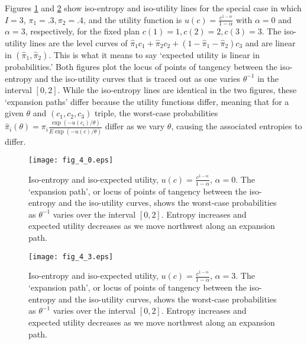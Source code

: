 Figures \ref{fig_num2} and \ref{fig_num4} show iso-entropy and iso-utility lines for the special
case in which $I = 3$, $\pi_1 = .3, \pi_2 = .4$,  and the utility
function is $u(c)= \frac{c^{1-\alpha}}{1-\alpha}$ with $\alpha =0$ and $\alpha =3$, respectively,
for the fixed plan $c(1) = 1, c(2) =2 , c(3) =3 $. The iso-utility lines are the level curves
of $\hat \pi_1 c_1 + \hat \pi_2 c_2 + (1-\hat \pi_1 - \hat \pi_2) c_3$  and are linear in $(\hat \pi_1, \hat \pi_2)$.
This is what it  means to  say  `expected utility is linear in probabilities.'
Both figures plot the locus of points of tangency between the iso-entropy and the iso-utility curves that is traced out
as one varies $\theta^{-1}$ in the interval $[0, 2]$.  While the iso-entropy lines are identical
 in the two figures, these `expansion paths'  differ because the utility functions differ, meaning that
 for a given $\theta$ and $(c_1, c_2, c_3)$ %
 triple, the worst-case probabilities $\hat \pi_i(\theta) =
 \pi_i \frac{\exp(-u(c_i)/\theta )} {E\exp(-u(c)/\theta )}$ differ as we vary $\theta$, causing the associated entropies to differ.









\begin{figure}[htp]
\centering
\texttt{[image: fig\_4\_0.eps]}
\caption[Iso-entropy and iso-expected utility curves]{Iso-entropy and iso-expected utility, $u(c) = \frac{c^{1-\alpha}}{1-\alpha}$,  $\alpha = 0$. The  `expansion path', or locus of points of tangency between the iso-entropy and the iso-utility curves,  shows the worst-case probabilities as $\theta^{-1}$ varies over the interval $[0, 2]$. Entropy increases and expected utility decreases as we move northwest along an expansion path.}\label{fig_num2}
\end{figure}




\begin{figure}[htp]
\centering
\texttt{[image: fig\_4\_3.eps]}
\caption[More iso-entropy and iso-expected utility curves]{Iso-entropy and iso-expected utility, $u(c) = \frac{c^{1-\alpha}}{1-\alpha}$, $\alpha = 3$. The  `expansion path', or locus of points of tangency between the iso-entropy and the iso-utility curves,  shows the worst-case probabilities as $\theta^{-1}$ varies over the interval $[0, 2]$. Entropy increases and expected utility decreases as we move northwest along an expansion path.}\label{fig_num4}
\end{figure}



